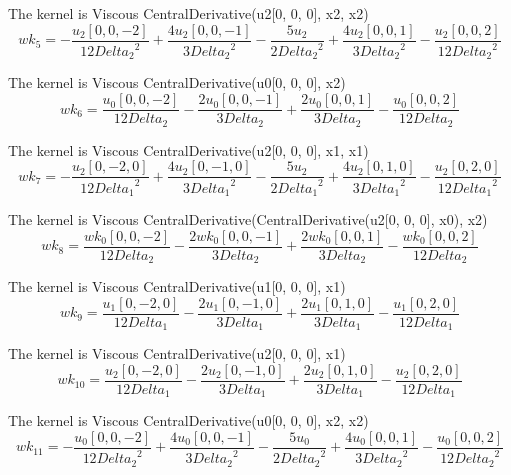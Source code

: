\documentclass{article}
\begin{document}
The kernel is Viscous CentralDerivative(u2[0, 0, 0], x2, x2) \begin{dmath}{wk_{5}} = - \frac{{u_{2}}[{0,0,-2}]}{12 {Delta_2}^{2}} + 
\frac{4 {u_{2}}[{0,0,-1}]}{3 {Delta_2}^{2}} - \frac{5 {u_{2}}}{2 
{Delta_2}^{2}} + \frac{4 {u_{2}}[{0,0,1}]}{3 {Delta_2}^{2}} - 
\frac{{u_{2}}[{0,0,2}]}{12 {Delta_2}^{2}}\end{dmath}

The kernel is Viscous CentralDerivative(u0[0, 0, 0], x2) \begin{dmath}{wk_{6}} = \frac{{u_{0}}[{0,0,-2}]}{12 Delta_2} - \frac{2 
{u_{0}}[{0,0,-1}]}{3 Delta_2} + \frac{2 {u_{0}}[{0,0,1}]}{3 Delta_2} - 
\frac{{u_{0}}[{0,0,2}]}{12 Delta_2}\end{dmath}

The kernel is Viscous CentralDerivative(u2[0, 0, 0], x1, x1) \begin{dmath}{wk_{7}} = - \frac{{u_{2}}[{0,-2,0}]}{12 {Delta_1}^{2}} + 
\frac{4 {u_{2}}[{0,-1,0}]}{3 {Delta_1}^{2}} - \frac{5 {u_{2}}}{2 
{Delta_1}^{2}} + \frac{4 {u_{2}}[{0,1,0}]}{3 {Delta_1}^{2}} - 
\frac{{u_{2}}[{0,2,0}]}{12 {Delta_1}^{2}}\end{dmath}

The kernel is Viscous CentralDerivative(CentralDerivative(u2[0, 0, 0], x0), x2) \begin{dmath}{wk_{8}} = \frac{{wk_{0}}[{0,0,-2}]}{12 Delta_2} - 
\frac{2 {wk_{0}}[{0,0,-1}]}{3 Delta_2} + \frac{2 {wk_{0}}[{0,0,1}]}{3 
Delta_2} - \frac{{wk_{0}}[{0,0,2}]}{12 Delta_2}\end{dmath}

The kernel is Viscous CentralDerivative(u1[0, 0, 0], x1) \begin{dmath}{wk_{9}} = \frac{{u_{1}}[{0,-2,0}]}{12 Delta_1} - \frac{2 
{u_{1}}[{0,-1,0}]}{3 Delta_1} + \frac{2 {u_{1}}[{0,1,0}]}{3 Delta_1} - 
\frac{{u_{1}}[{0,2,0}]}{12 Delta_1}\end{dmath}

The kernel is Viscous CentralDerivative(u2[0, 0, 0], x1) \begin{dmath}{wk_{10}} = \frac{{u_{2}}[{0,-2,0}]}{12 Delta_1} - 
\frac{2 {u_{2}}[{0,-1,0}]}{3 Delta_1} + \frac{2 {u_{2}}[{0,1,0}]}{3 
Delta_1} - \frac{{u_{2}}[{0,2,0}]}{12 Delta_1}\end{dmath}

The kernel is Viscous CentralDerivative(u0[0, 0, 0], x2, x2) \begin{dmath}{wk_{11}} = - \frac{{u_{0}}[{0,0,-2}]}{12 {Delta_2}^{2}} 
+ \frac{4 {u_{0}}[{0,0,-1}]}{3 {Delta_2}^{2}} - \frac{5 {u_{0}}}{2 
{Delta_2}^{2}} + \frac{4 {u_{0}}[{0,0,1}]}{3 {Delta_2}^{2}} - 
\frac{{u_{0}}[{0,0,2}]}{12 {Delta_2}^{2}}\end{dmath}
\end{document}
